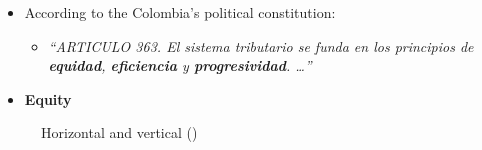 \documentclass[
  ignorenonframetext,
]{beamer}
\providecommand{\tightlist}{%
  \setlength{\itemsep}{0pt}\setlength{\parskip}{0pt}}\usepackage{longtable,booktabs,array}
\begin{document}
\begin{frame}{}
\label{section-15}
\begin{itemize}
\item
  According to the Colombia's political constitution:

  \begin{itemize}
  \tightlist
  \item
    \emph{``ARTICULO 363. El sistema tributario se funda en los
    principios de \textbf{equidad}, \textbf{eficiencia} y
    \textbf{progresividad}. \ldots{}''}
  \end{itemize}
\item
  \textbf{Equity}
\end{itemize}

\begin{figure}

\begin{minipage}{0.50\linewidth}



\end{minipage}%
%
\begin{minipage}{0.50\linewidth}



\end{minipage}%

\caption{\label{fig-horizontal_vs_vertical_equity}Horizontal and
vertical
()}

\end{figure}%
\end{frame}
\end{document}
